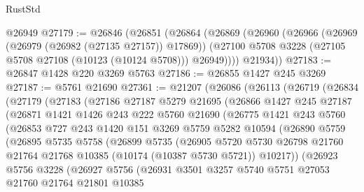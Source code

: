 \begin{lexlean}{RustStd}
\begin{coremodule}
    @26949
@27179 := @26846
    (@26851
      (@26864
        (@26869
          (@26960
            (@26966
              (@26969 (@26979 (@26982 (@27135 @27157)) @17869))
              (@27100 @5708 @3228 (@27105 @5708 @27108 (@10123 (@10124 @5708))) @26949))))
        @21934))
@27183 := @26847 @1428 @220 @3269 @5763
@27186 := @26855 @1427 @245 @3269
@27187 := @5761 @21690
@27361 := @21207
    (@26086
      (@26113
        (@26719
          (@26834
            (@27179
              (@27183
                (@27186
                  @27187
                  @5279
                  @21695
                  (@26866
                    @1427
                    @245
                    @27187
                    (@26871
                      @1421
                      @1426
                      @243
                      @222
                      @5760
                      @21690
                      (@26775
                        @1421
                        @243
                        @5760
                        (@26853
                          @727
                          @243
                          @1420
                          @151
                          @3269
                          @5759
                          @5282
                          @10594
                          (@26890
                            @5759
                            (@26895
                              @5735
                              @5758
                              (@26899
                                @5735
                                (@26905
                                  @5720
                                  @5730
                                  @26798
                                  @21760
                                  @21764
                                  @21768
                                  @10385
                                  (@10174 (@10387 @5730 @5721))
                                  @10217))
                              (@26923
                                @5756
                                @3228
                                (@26927
                                  @5756
                                  (@26931
                                    @3501
                                    @3257
                                    @5740
                                    @5751
                                    @27053
                                    @21760
                                    @21764
                                    @21801
                                    @10385

\end{coremodule}
\end{lexlean}
